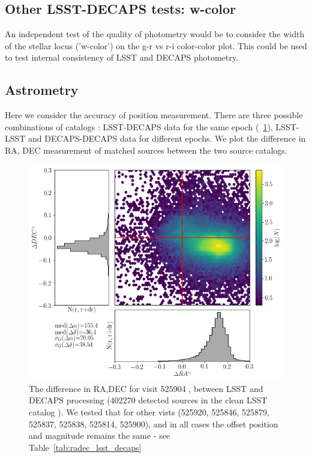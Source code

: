 \documentclass[DM,lsstdraft,toc,usenatbib]{lsstdoc}
\begin{document}
\subsection{Other LSST-DECAPS tests: w-color }
An independent test of the quality of photometry would be to consider the width of the stellar locus ('w-color') on the g-r vs r-i color-color plot.  This could be used to test internal consistency of LSST and DECAPS photometry. 

\subsection{Astrometry}
Here we consider the accuracy of position measurement. There are three possible combinations of catalogs : LSST-DECAPS data for the same epoch (~\ref{fig:ra_dec_lsst_decaps}),  LSST-LSST and DECAPS-DECAPS data for different epochs.  We plot the difference in RA, DEC measurement of matched sources between the two source catalogs. 


\begin{figure}
\begin{centering}
\includegraphics[width=0.8\columnwidth]{figs/22_525904_RA_DEC_offset.png}
\caption{The difference in RA,DEC for visit 525904 , between LSST and DECAPS processing (402270 detected sources in  the clean LSST catalog ). We tested that for other vists (525920, 525846, 525879, 525837, 525838, 525814, 525900), and in all cases the offset position and magnitude remains the same - see Table~\ref{tab:radec_lsst_decaps}}
\label{fig:ra_dec_lsst_decaps}
\end{centering}
\end{figure} 
\end{document}
